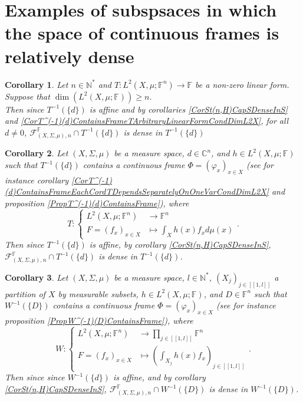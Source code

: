 \documentclass[a4paper,12pt]{article}
\theoremstyle{plain}
\newtheorem{corollary}{Corollary}[section]
\theoremstyle{definition}
\theoremstyle{remark}
\begin{document}
\section{Examples of subspsaces in which the space of continuous frames is relatively dense}
\label{SectionExamples}

\begin{corollary}
Let $n \in \mathbb{N}^*$ and $T : L^2(X,\mu;\mathbb{F}^n) \to \mathbb{F}$ be a non-zero linear form. \\
Suppose that $\dim(L^2(X,\mu;\mathbb{F})) \geq n$. \\
Then since $T^{-1}(\{d\})$ is affine and by corollaries \ref{CorSt(n,H)CapSDenseInS} and \ref{CorT^(-1)(d)ContainsFrameTArbitraryLinearFormCondDimL2X}, for all $d \neq 0$, $\mathcal{F}_{(X,\Sigma,\mu),n}^\mathbb{F} \cap T^{-1}(\{d\})$ is dense in $T^{-1}(\{d\})$
\end{corollary}

\begin{corollary}
Let $(X,\Sigma,\mu)$ be a measure space, $d \in \mathbb{C}^n$, and $h \in L^2(X,\mu;\mathbb{F})$ such that $T^{-1}(\{d\})$ contains a continuous frame $\Phi = (\varphi_x)_{x \in X}$ (see for instance corollary \ref{CorT^(-1)(d)ContainsFrameEachCordTDependsSeparatelyOnOneVarCondDimL2X} and proposition \ref{PropT^(-1)(d)ContainsFrame}), where 
\[ T : \begin{cases} L^2(X,\mu;\mathbb{F}^n) &\to \mathbb{F}^n \\ F = (f_x)_{x \in X} &\mapsto \int_X h(x)f_x d\mu(x) \end{cases}. \]
Then since $T^{-1}(\{d\})$ is affine, by corollary \ref{CorSt(n,H)CapSDenseInS}, $\mathcal{F}_{(X,\Sigma,\mu),n}^\mathbb{F} \cap T^{-1}(\{d\})$ is dense in $T^{-1}(\{d\})$.
\end{corollary}

\begin{corollary}
Let $(X,\Sigma,\mu)$ be a measure space, $l \in \mathbb{N}^*$, $(X_j)_{j \in [\![1,l]\!]}$ a partition of $X$ by measurable subsets, $h \in L^2(X,\mu;\mathbb{F})$, and $D \in \mathbb{F}^n$ such that $W^{-1}(\{D\})$ contains a continuous frame $\Phi = (\varphi_x)_{x \in X}$ (see for instance proposition \ref{PropW^(-1)(D)ContainsFrame}), where 
\[ W : \begin{cases} L^2(X,\mu;\mathbb{F}^n) &\to \prod_{j \in [\![1,l]\!]} \mathbb{F}^n \\ F = (f_x)_{x \in X} &\mapsto (\int_{X_j} h(x)f_x)_{j \in [\![1,l]\!]} \end{cases}. \]
Then since since $W^{-1}(\{d\})$ is affine, and by corollary \ref{CorSt(n,H)CapSDenseInS}, $\mathcal{F}_{(X,\Sigma,\mu),n}^\mathbb{F} \cap W^{-1}(\{D\})$ is dense in $W^{-1}(\{D\})$.
\end{corollary}
\end{document}
